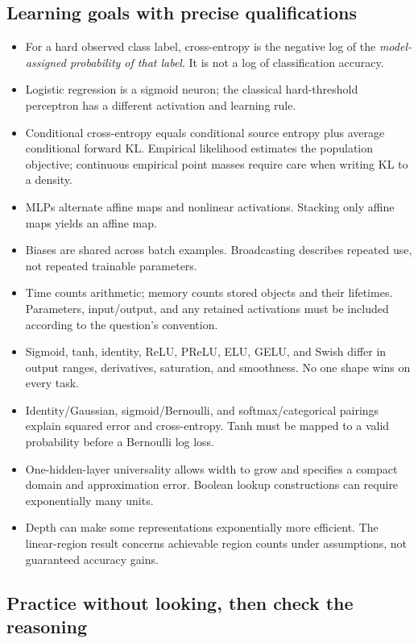 \subsection{Learning goals with precise qualifications}
\begin{itemize}
\item For a hard observed class label, cross-entropy is the negative log of the \emph{model-assigned probability of that label}. It is not a log of classification accuracy.
\item Logistic regression is a sigmoid neuron; the classical hard-threshold perceptron has a different activation and learning rule.
\item Conditional cross-entropy equals conditional source entropy plus average conditional forward KL. Empirical likelihood estimates the population objective; continuous empirical point masses require care when writing KL to a density.
\item MLPs alternate affine maps and nonlinear activations. Stacking only affine maps yields an affine map.
\item Biases are shared across batch examples. Broadcasting describes repeated use, not repeated trainable parameters.
\item Time counts arithmetic; memory counts stored objects and their lifetimes. Parameters, input/output, and any retained activations must be included according to the question's convention.
\item Sigmoid, tanh, identity, ReLU, PReLU, ELU, GELU, and Swish differ in output ranges, derivatives, saturation, and smoothness. No one shape wins on every task.
\item Identity/Gaussian, sigmoid/Bernoulli, and softmax/categorical pairings explain squared error and cross-entropy. Tanh must be mapped to a valid probability before a Bernoulli log loss.
\item One-hidden-layer universality allows width to grow and specifies a compact domain and approximation error. Boolean lookup constructions can require exponentially many units.
\item Depth can make some representations exponentially more efficient. The linear-region result concerns achievable region counts under assumptions, not guaranteed accuracy gains.
\end{itemize}

\subsection{Practice without looking, then check the reasoning}
